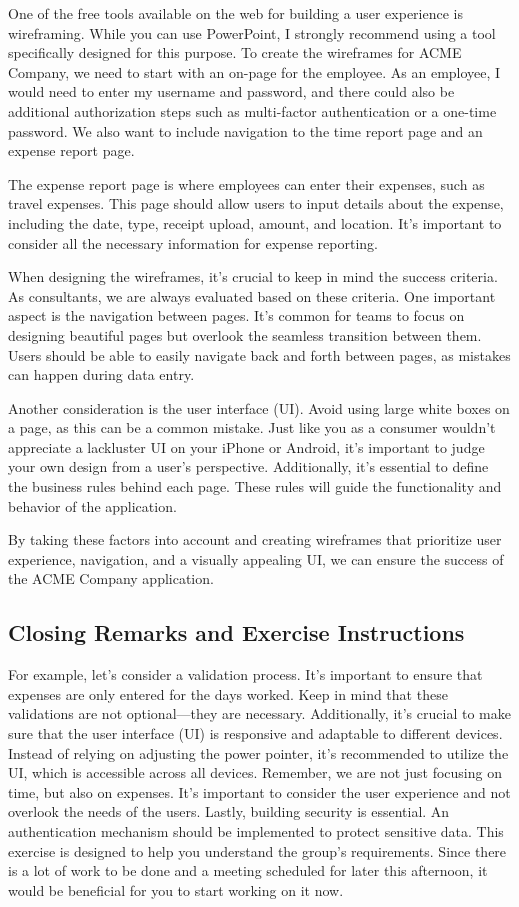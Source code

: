 One of the free tools available on the web for building a user
experience is wireframing. While you can use PowerPoint, I strongly
recommend using a tool specifically designed for this purpose. To create
the wireframes for ACME Company, we need to start with an on-page for
the employee. As an employee, I would need to enter my username and
password, and there could also be additional authorization steps such as
multi-factor authentication or a one-time password. We also want to
include navigation to the time report page and an expense report page.

The expense report page is where employees can enter their expenses,
such as travel expenses. This page should allow users to input details
about the expense, including the date, type, receipt upload, amount, and
location. It's important to consider all the necessary information for
expense reporting.

When designing the wireframes, it's crucial to keep in mind the success
criteria. As consultants, we are always evaluated based on these
criteria. One important aspect is the navigation between pages. It's
common for teams to focus on designing beautiful pages but overlook the
seamless transition between them. Users should be able to easily
navigate back and forth between pages, as mistakes can happen during
data entry.

Another consideration is the user interface (UI). Avoid using large
white boxes on a page, as this can be a common mistake. Just like you as
a consumer wouldn't appreciate a lackluster UI on your iPhone or
Android, it's important to judge your own design from a user's
perspective. Additionally, it's essential to define the business rules
behind each page. These rules will guide the functionality and behavior
of the application.

By taking these factors into account and creating wireframes that
prioritize user experience, navigation, and a visually appealing UI, we
can ensure the success of the ACME Company application.

\subsection{Closing Remarks and Exercise
  Instructions}\label{closing-remarks-and-exercise-instructions}

For example, let's consider a validation process. It's important to
ensure that expenses are only entered for the days worked. Keep in mind
that these validations are not optional---they are necessary.
Additionally, it's crucial to make sure that the user interface (UI) is
responsive and adaptable to different devices. Instead of relying on
adjusting the power pointer, it's recommended to utilize the UI, which
is accessible across all devices. Remember, we are not just focusing on
time, but also on expenses. It's important to consider the user
experience and not overlook the needs of the users. Lastly, building
security is essential. An authentication mechanism should be implemented
to protect sensitive data. This exercise is designed to help you
understand the group's requirements. Since there is a lot of work to be
done and a meeting scheduled for later this afternoon, it would be
beneficial for you to start working on it now.
